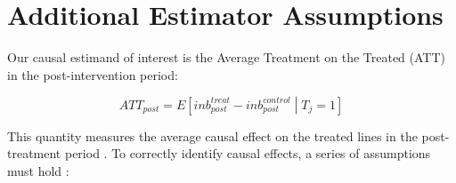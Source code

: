 \documentclass[12pt,letterpaper]{article}
\begin{document}





\section{Additional Estimator Assumptions}
\label{app:estimator}
Our causal estimand of interest is the Average Treatment on the Treated (ATT) in the post-intervention period:

\begin{equation*}
    ATT_{post}=E\left[inb_{post}^{treat}-inb_{post}^{control} \middle| T_{j}=1\right]
\end{equation*}

This quantity measures the average causal effect on the treated lines in the post-treatment period \citep{Roth2023}. To correctly identify causal effects, a series of assumptions must hold \citep{Sun2021}:
\end{document}
